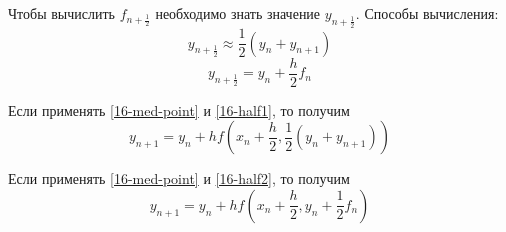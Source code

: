 Чтобы вычислить $f_{n + \frac{1}{2}}$ необходимо знать значение
$y_{n + \frac{1}{2}}$. Способы вычисления:
\begin{equation}
  \label{16-half1}
  y_{n + \frac{1}{2}} \approx \frac{1}{2}(y_n + y_{n + 1})
\end{equation}
\begin{equation}
  \label{16-half2}
  y_{n + \frac{1}{2}} = y_n + \frac{h}{2}f_n
\end{equation}

Если применять \eqref{16-med-point} и \eqref{16-half1}, то получим
\begin{equation}
  y_{n + 1} = y_n + hf\left(x_n + \frac{h}{2}, \frac{1}{2}(y_n + y_{n + 1})
  \right)
\end{equation}

Если применять \eqref{16-med-point} и \eqref{16-half2}, то получим
\begin{equation}
  y_{n + 1} = y_n + hf\left(x_n + \frac{h}{2}, y_n + \frac{1}{2}f_n\right)
\end{equation}
